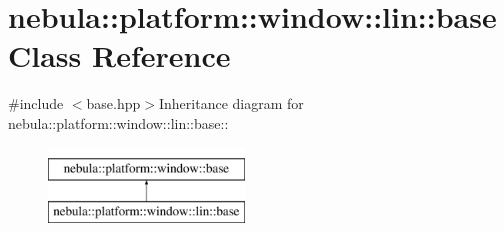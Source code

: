 \hypertarget{classnebula_1_1platform_1_1window_1_1lin_1_1base}{
\section{nebula::platform::window::lin::base Class Reference}
\label{classnebula_1_1platform_1_1window_1_1lin_1_1base}
}


{\ttfamily \#include $<$base.hpp$>$}Inheritance diagram for nebula::platform::window::lin::base::\begin{figure}[H]
\begin{center}
\leavevmode
\includegraphics[height=2cm]{classnebula_1_1platform_1_1window_1_1lin_1_1base}
\end{center}
\end{figure}
